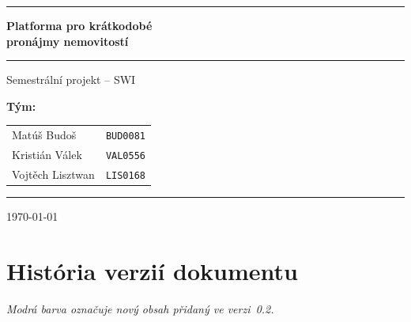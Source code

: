 \documentclass[11pt, a4paper]{article}
\begin{document}

\begin{titlepage}
  \thispagestyle{empty}
  \centering
  \vspace*{2.5cm}

  {\color{mainblue}\rule{\textwidth}{2.5pt}}
  \vspace{0.7cm}

  {\fontsize{26}{32}\selectfont\bfseries\color{mainblue}
    Platforma pro krátkodobé\\[0.4em] pronájmy nemovitostí}

  \vspace{0.5cm}
  {\color{ruleblue}\rule{\textwidth}{0.8pt}}
  \vspace{0.8cm}

  {\Large\color{darkgray} Semestrální projekt -- SWI}

  \vspace{3.5cm}

  \begin{flushleft}
    \large\color{darkgray}
    \textbf{\color{mainblue}Tým:}\\[0.6em]
    \begin{tabular}{@{}l@{\hskip 1.5cm}l@{}}
      Matúš Budoš      & \texttt{BUD0081} \\[0.3em]
      Kristián Válek   & \texttt{VAL0556} \\[0.3em]
      Vojtěch Lisztwan & \texttt{LIS0168} \\
    \end{tabular}
  \end{flushleft}

  \vfill
  {\color{ruleblue}\rule{\textwidth}{0.8pt}}
  \vspace{0.4cm}
  {\large\color{darkgray}\today}
\end{titlepage}

\thispagestyle{fancy}
\section*{\color{mainblue}História verzií dokumentu}

\noindent\small\textit{%
  \textcolor{newblue}{Modrá barva označuje nový obsah přidaný ve verzi~0.2.}}
\end{document}
